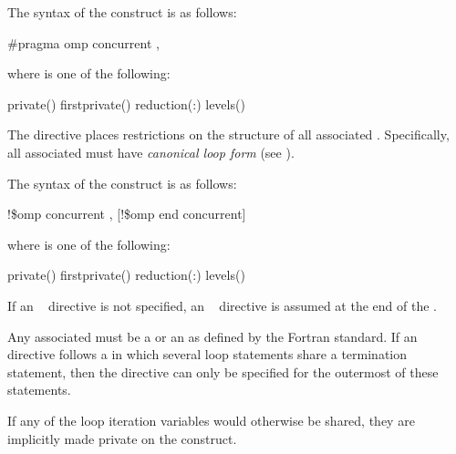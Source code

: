 \syntax
\begin{ccppspecific}
The syntax of the  construct is as follows:
\begin{boxedcode}
\#pragma omp concurrent \plc{[clause[ [},\plc{] clause] ... ] new-line}
\end{boxedcode}

where  is one of the following:

\begin{indentedcodelist}
private()
firstprivate()
reduction(:)
levels()

\end{indentedcodelist}
The  directive places restrictions on the structure of all associated . 
Specifically, all associated  must have \emph{canonical loop form} (see 
).
\end{ccppspecific}

\begin{fortranspecific}
The syntax of the  construct is as follows:

\begin{boxedcode}
!\$omp concurrent \plc{[clause[ [},\plc{] clause] ... ]}
[!\$omp end concurrent]
\end{boxedcode}

\begin{samepage}
where  is one of the following:

\begin{indentedcodelist}
private()
firstprivate()
reduction(:)
levels()
\end{indentedcodelist}
\end{samepage}

If an ~ directive is not specified, an
  ~ directive is assumed at the end of the 
.

Any associated  must be a  or an
 as defined by the Fortran standard. If
an ~ directive follows a  in
which several loop statements share a  termination statement,
then the directive can only be specified for the outermost of these
 statements.

If any of the loop iteration variables would otherwise be shared, they are implicitly 
  made private on the  construct.
\end{fortranspecific}

